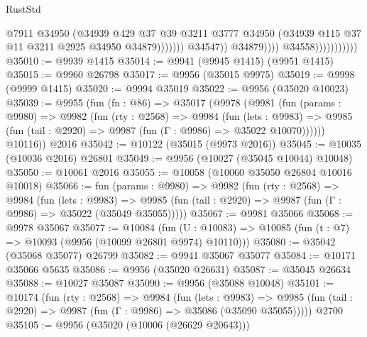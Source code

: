 \begin{lexlean}{RustStd}
\begin{coremodule}
                                                @7911
                                                @34950
                                                (@34939
                                                  @429
                                                  @37
                                                  @39
                                                  @3211
                                                  @3777
                                                  @34950
                                                  (@34939
                                                    @115
                                                    @37
                                                    @11
                                                    @3211
                                                    @2925
                                                    @34950
                                                    @34879)))))))
                                      @34547))
                                  @34879))))
                          @34558)))))))))))
@35010 := @9939 @1415
@35014 := @9941 (@9945 @1415) (@9951 @1415)
@35015 := @9960 @26798
@35017 := @9956 (@35015 @9975)
@35019 := @9998 (@9999 @1415)
@35020 := @9994 @35019
@35022 := @9956 (@35020 @10023)
@35039 := @9955
    (fun (fn : @86) =>
    @35017
      (@9978
        (@9981
          (fun (params : @9980) =>
          @9982
            (fun (rty : @2568) =>
            @9984
              (fun (lets : @9983) =>
              @9985 (fun (tail : @2920) => @9987 (fun (Γ : @9986) => @35022 @10070))))))
        @10116))
    @2016
@35042 := @10122 (@35015 (@9973 @2016))
@35045 := @10035 (@10036 @2016) @26801
@35049 := @9956 (@10027 (@35045 @10044) @10048)
@35050 := @10061 @2016
@35055 := @10058 (@10060 @35050 @26804 @10016 @10018)
@35066 := fun (params : @9980) =>
  @9982
    (fun (rty : @2568) =>
    @9984
      (fun (lets : @9983) =>
      @9985 (fun (tail : @2920) => @9987 (fun (Γ : @9986) => @35022 (@35049 @35055)))))
@35067 := @9981 @35066
@35068 := @9978 @35067
@35077 := @10084
    (fun (U : @10083) => @10085 (fun (t : @7) => @10093 (@9956 (@10099 @26801 @9974) @10110)))
@35080 := @35042 (@35068 @35077) @26799
@35082 := @9941 @35067 @35077
@35084 := @10171 @35066 @5635
@35086 := @9956 (@35020 @26631)
@35087 := @35045 @26634
@35088 := @10027 @35087
@35090 := @9956 (@35088 @10048)
@35101 := @10174
    (fun (rty : @2568) =>
    @9984
      (fun (lets : @9983) =>
      @9985 (fun (tail : @2920) => @9987 (fun (Γ : @9986) => @35086 (@35090 @35055)))))
    @2700
@35105 := @9956 (@35020 (@10006 (@26629 @20643)))

\end{coremodule}
\end{lexlean}
